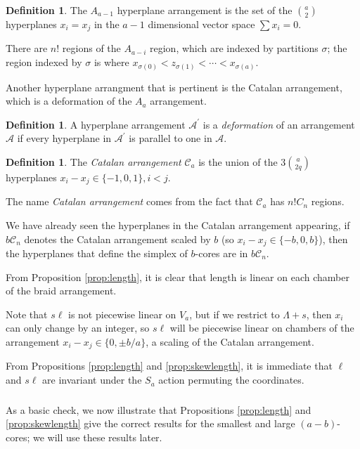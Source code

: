 \documentclass{amsart}[12pt]
\theoremstyle{definition}
\newtheorem{definition}[dummy]{Definition}
\newcommand{\sk}{s\ell}
\begin{document}
\begin{definition}
The $A_{a-1}$ hyperplane arrangement is the set of the $\binom{a}{2}$ hyperplanes $x_i=x_j$ in the $a-1$ dimensional vector space $\sum x_i=0$.

There are $n!$ regions of the $A_{a-i}$ region, which are indexed by partitions $\sigma$; the region indexed by $\sigma$ is where $x_{\sigma(0)}<z_{\sigma(1)}<\cdots<x_{\sigma(a)}$.
\end{definition}

Another hyperplane arrangment that is pertinent is the Catalan arrangement, which is a deformation of the $A_a$ arrangement.

\begin{definition}
A hyperplane arrangement $\mathcal{A}^\prime$ is a \emph{deformation} of an arrangement $\mathcal{A}$ if every hyperplane in $\mathcal{A}^\prime$ is parallel to one in $\mathcal{A}$.
\end{definition}

\begin{definition} \label{def:arrangements}
The \emph{Catalan arrangement} $\mathcal{C}_a$ is the union of the $3\binom{a}{2q}$ hyperplanes $x_i-x_j\in\{-1,0,1\}, i<j$.
\end{definition}

The name \emph{Catalan arrangement} comes from the fact that $\mathcal{C}_a$ has $n!C_n$ regions.

We have already seen the hyperplanes in the Catalan arrangement appearing, if $b\mathcal{C}_n$ denotes the Catalan arrangement scaled by $b$ (so $x_i-x_j\in\{-b,0,b\}$), then the hyperplanes that define the simplex of $b$-cores are in $b\mathcal{C}_n$.



From Proposition \ref{prop:length}, it is clear that length is linear on each chamber of the braid arrangement.  

Note that $\sk$ is not piecewise linear on $V_a$, but if we restrict to $\Lambda+s$, then $x_i$ can only change by an integer, so $\sk$ will be piecewise linear on chambers of the arrangement $x_i-x_j\in \{0,\pm b/a\}$, a scaling of the Catalan arrangement.

From Propositions \ref{prop:length} and \ref{prop:skewlength}, it is immediate that $\ell$ and $\sk$ are invariant under the $S_a$ action permuting the coordinates. 


\subsubsection{}
As a basic check, we now illustrate that Propositions \ref{prop:length} and \ref{prop:skewlength} give the correct results for the smallest and large $(a-b)$-cores; we will use these results later.
\end{document}
